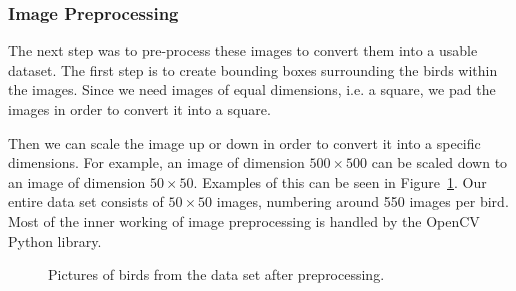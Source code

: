 \documentclass[11pt]{article}
\begin{document}
  \subsubsection{Image Preprocessing}
  The next step was to pre-process these images to convert them into a
  usable dataset. The first step is to create bounding boxes surrounding the birds within the images.
  Since we need images of equal dimensions, i.e. a square, we pad the images in order 
  to convert it into a square.

  Then we can scale the image up or down in order to convert it into a specific dimensions. 
  For example, an image of dimension $500 \times 500$ can be scaled down to an 
  image of dimension $50 \times 50$. Examples of this can be seen in Figure~\ref{fig:birds}.
  Our entire data set consists of $50 \times 50$ images, numbering around 550 images per bird.
  Most of the inner working of image preprocessing is handled by the OpenCV Python library.
  

 \begin{center}
    \begin{figure}[h!]
    \centering
    \qquad
    \qquad

   \caption{Pictures of birds from the data set after preprocessing.}%
   \label{fig:birds}
    \end{figure}
  \end{center}
\end{document}
